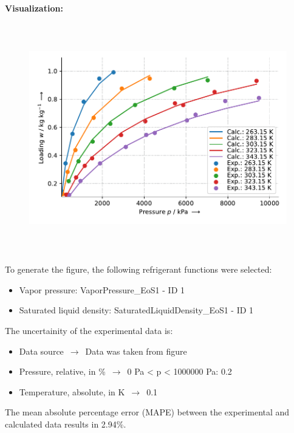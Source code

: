\textbf{Visualization:}
%
\begin{figure}[!htp]
{\noindent\includegraphics[height=10cm, keepaspectratio]{figs/ads/ads_CarbonDioxide_activated_carbon_fiber_A-20_Toth_1.pdf}}
\end{figure}
%

To generate the figure, the following refrigerant functions were selected:
\begin{itemize}
\item Vapor pressure: VaporPressure\_EoS1 - ID 1
\item Saturated liquid density: SaturatedLiquidDensity\_EoS1 - ID 1
\end{itemize}

The uncertainity of the experimental data is:
\begin{itemize}
\item Data source $\,\to\,$ Data was taken from figure
\item Pressure, relative, in \% $\,\to\,$ 0 Pa < p < 1000000 Pa: 0.2 %
\item Temperature, absolute, in $\si{\kelvin}$ $\,\to\,$ 0.1
\end{itemize}

The mean absolute percentage error (MAPE) between the experimental and calculated data results in 2.94\%.
\FloatBarrier
\newpage

